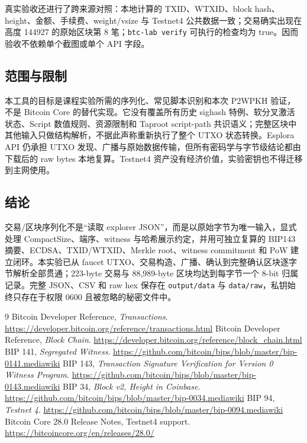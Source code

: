 \documentclass[11pt,a4paper,fontset=none]{ctexart}
\begin{document}
真实验收还进行了跨来源对照：本地计算的 TXID、WTXID、block hash、height、金额、手续费、weight/vsize 与 Testnet4 公共数据一致；交易确实出现在高度 144927 的原始区块第 8 笔；\texttt{btc-lab verify} 可执行的检查均为 true。因而验收不依赖单个截图或单个 API 字段。

\subsection{范围与限制}

本工具的目标是课程实验所需的序列化、常见脚本识别和本次 P2WPKH 验证，不是 Bitcoin Core 的替代实现。它没有覆盖所有历史 sighash 特例、软分叉激活状态、Script 数值规则、资源限制和 Taproot script-path 共识语义；完整区块中其他输入只做结构解析，不据此声称重新执行了整个 UTXO 状态转换。Esplora API 仍承担 UTXO 发现、广播与原始数据传输，但所有密码学与字节级结论都由下载后的 raw bytes 本地复算。Testnet4 资产没有经济价值，实验密钥也不得迁移到主网使用。

\subsection{结论}

交易/区块序列化不是“读取 explorer JSON”，而是以原始字节为唯一输入，显式处理 CompactSize、端序、witness 与哈希展示约定，并用可独立复算的 BIP143 摘要、ECDSA、TXID/WTXID、Merkle root、witness commitment 和 PoW 建立闭环。本实验已从 faucet UTXO、交易构造、广播、确认到完整确认区块逐字节解析全部贯通；223-byte 交易与 88,989-byte 区块均达到每字节一个 8-bit 归属记录。完整 JSON、CSV 和 raw hex 保存在 \texttt{output/data} 与 \texttt{data/raw}，私钥始终只存在于权限 0600 且被忽略的秘密文件中。

\begin{thebibliography}{9}
 Bitcoin Developer Reference, \emph{Transactions}. \url{https://developer.bitcoin.org/reference/transactions.html}
 Bitcoin Developer Reference, \emph{Block Chain}. \url{https://developer.bitcoin.org/reference/block_chain.html}
 BIP 141, \emph{Segregated Witness}. \url{https://github.com/bitcoin/bips/blob/master/bip-0141.mediawiki}
 BIP 143, \emph{Transaction Signature Verification for Version 0 Witness Program}. \url{https://github.com/bitcoin/bips/blob/master/bip-0143.mediawiki}
 BIP 34, \emph{Block v2, Height in Coinbase}. \url{https://github.com/bitcoin/bips/blob/master/bip-0034.mediawiki}
 BIP 94, \emph{Testnet 4}. \url{https://github.com/bitcoin/bips/blob/master/bip-0094.mediawiki}
 Bitcoin Core 28.0 Release Notes, Testnet4 support. \url{https://bitcoincore.org/en/releases/28.0/}
\end{thebibliography}
\end{document}
